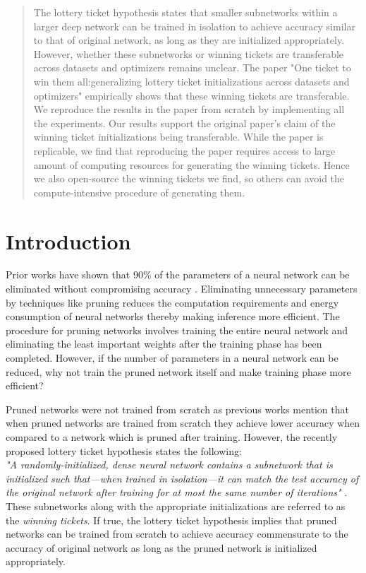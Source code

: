 \begin{abstract}
    The lottery ticket hypothesis states that smaller subnetworks within a larger deep network can be trained in isolation to achieve accuracy similar to that of original network, as long as they are initialized appropriately. However, whether these subnetworks or winning tickets are transferable across datasets and optimizers remains unclear. The paper "One ticket to win them all:generalizing lottery ticket initializations across datasets and optimizers" empirically shows that these winning tickets are transferable. We reproduce the results in the paper from scratch by implementing all the experiments. 
    Our results support the original paper's claim of the winning ticket initializations being transferable. While the paper is replicable, we find that reproducing the paper requires access to large amount of computing resources for generating the winning tickets. Hence we also open-source the winning tickets we find, so others can avoid the compute-intensive procedure of generating them.
    \end{abstract}
    
    
    \section{Introduction}
    \label{sec:intro}
    Prior works have shown that 90\% of the parameters of a neural network can be eliminated without compromising accuracy \cite{han_prune, ref2}. Eliminating unnecessary parameters by techniques like pruning reduces the computation requirements and energy consumption of neural networks thereby making inference more efficient. The procedure for pruning networks involves training the entire neural network and eliminating the least important weights after the training phase has been completed. However, if the number of parameters in a neural network can be reduced, why not train the pruned network itself and make training phase more efficient?
    
    Pruned networks were not trained from scratch as previous works \cite{ref2, han_prune} mention that when pruned networks are trained from scratch they achieve lower accuracy when compared to a network which is pruned after training. However, the recently proposed lottery ticket hypothesis states the following:\\
    \textit{"A randomly-initialized, dense neural network contains a subnetwork that is initialized such that—when trained in isolation—it can match the test accuracy of the original network after training for at most the same number of iterations"} \cite{lth_orig_paper}.
    These subnetworks along with the appropriate initializations are referred to as the \textit{winning tickets}. If true, the lottery ticket hypothesis implies that pruned networks can be trained from scratch to achieve accuracy commensurate to the accuracy of original network as long as the pruned network is initialized appropriately. 
    
